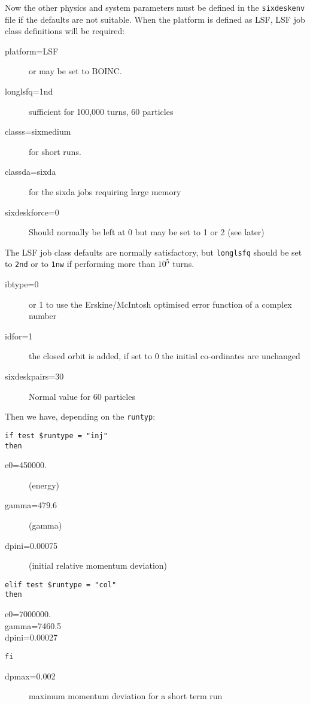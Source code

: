 \documentclass{cernatsnote}    %
\begin{document}
Now the other physics and system parameters must be defined in the
{\tt sixdeskenv} file if the defaults are not suitable.
When the platform is defined as LSF, 
LSF job class definitions will be required:
\begin{description}
\item[platform=LSF] or may be set to BOINC.
\item[longlsfq=1nd] sufficient for 100,000 turns, 60 particles
\item[classs=sixmedium] for short runs.
\item[classda=sixda] for the sixda jobs requiring large memory
\item[sixdeskforce=0] Should normally be left at 0 but may be set to 1 or 2 (see later)
\end{description}
The LSF job class defaults are normally satisfactory, but {\tt longlsfq}
should be set to {\tt 2nd} or to {\tt 1nw} if performing more than $10^5$ turns.

\begin{description}
\item[ibtype=0] or 1 to use the Erskine/McIntosh optimised error function
of a complex number
\item[idfor=1] the closed orbit is added, if set to 0 the initial co-ordinates are unchanged
\item[sixdeskpairs=30] Normal value for 60 particles 
\end{description}

Then we have, depending on the {\tt runtyp}:
\begin{verbatim}
if test $runtype = "inj"
then
\end{verbatim}
\begin{description}
\item[e0=450000.] (energy)
\item[gamma=479.6] (gamma)
\item[dpini=0.00075] (initial relative momentum deviation)
\end{description}
\begin{verbatim}
elif test $runtype = "col"
then
\end{verbatim}
\begin{description}
\item[e0=7000000.]
\item[gamma=7460.5]
\item[dpini=0.00027]
\end{description}
\begin{verbatim}
fi
\end{verbatim}
\begin{description}
\item[dpmax=0.002] maximum momentum deviation for a short term run
\end{description}
\end{document}
